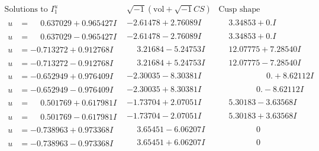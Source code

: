 \documentclass[1p]{elsarticle_modified}
\theoremstyle{definition}
\newcommand{\I}{\sqrt{-1}}
\begin{document}
$$\begin{array}{c|c|c}
\text{Solutions to }I^u_{1}& \I (\text{vol} + \sqrt{-1}CS) & \text{Cusp shape}\\
 \hline 
\begin{aligned}
u &= \phantom{-}0.637029 + 0.965427 I\end{aligned}
 & -2.61478 + 2.76089 I & \phantom{-}3.34853 + 0. I\phantom{ +0.000000I} \\ \hline\begin{aligned}
u &= \phantom{-}0.637029 - 0.965427 I\end{aligned}
 & -2.61478 - 2.76089 I & \phantom{-}3.34853 + 0. I\phantom{ +0.000000I} \\ \hline\begin{aligned}
u &= -0.713272 + 0.912768 I\end{aligned}
 & \phantom{-}3.21684 - 5.24753 I & \phantom{-}12.07775 + 7.28540 I \\ \hline\begin{aligned}
u &= -0.713272 - 0.912768 I\end{aligned}
 & \phantom{-}3.21684 + 5.24753 I & \phantom{-}12.07775 - 7.28540 I \\ \hline\begin{aligned}
u &= -0.652949 + 0.976409 I\end{aligned}
 & -2.30035 - 8.30381 I & \phantom{-0.000000 -}0. + 8.62112 I \\ \hline\begin{aligned}
u &= -0.652949 - 0.976409 I\end{aligned}
 & -2.30035 + 8.30381 I & \phantom{-0.000000 } 0. - 8.62112 I \\ \hline\begin{aligned}
u &= \phantom{-}0.501769 + 0.617981 I\end{aligned}
 & -1.73704 + 2.07051 I & \phantom{-}5.30183 - 3.63568 I \\ \hline\begin{aligned}
u &= \phantom{-}0.501769 - 0.617981 I\end{aligned}
 & -1.73704 - 2.07051 I & \phantom{-}5.30183 + 3.63568 I \\ \hline\begin{aligned}
u &= -0.738963 + 0.973368 I\end{aligned}
 & \phantom{-}3.65451 - 6.06207 I & \phantom{-0.000000 } 0 \\ \hline\begin{aligned}
u &= -0.738963 - 0.973368 I\end{aligned}
 & \phantom{-}3.65451 + 6.06207 I & \phantom{-0.000000 } 0 \\ \hline\begin{aligned}

\end{aligned}
\end{array}$$
\end{document}
